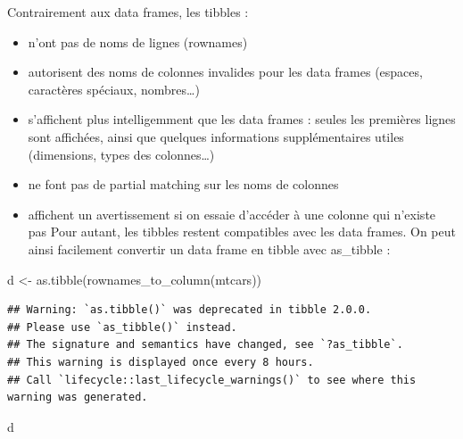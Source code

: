 \documentclass[
]{book}
\newenvironment{Shaded}{\begin{snugshade}}{\end{snugshade}}
\newcommand{\FunctionTok}[1]{\textcolor[rgb]{0.00,0.00,0.00}{#1}}
\newcommand{\NormalTok}[1]{#1}
\newcommand{\OtherTok}[1]{\textcolor[rgb]{0.56,0.35,0.01}{#1}}
\providecommand{\tightlist}{%
  \setlength{\itemsep}{0pt}\setlength{\parskip}{0pt}}
\begin{document}
Contrairement aux data frames, les tibbles :

\begin{itemize}
\tightlist
\item
  n'ont pas de noms de lignes (rownames)
\item
  autorisent des noms de colonnes invalides pour les data frames (espaces, caractères spéciaux, nombres\ldots)
\item
  s'affichent plus intelligemment que les data frames : seules les premières lignes sont affichées, ainsi que quelques informations supplémentaires utiles (dimensions, types des colonnes\ldots)
\item
  ne font pas de partial matching sur les noms de colonnes
\item
  affichent un avertissement si on essaie d'accéder à une colonne qui n'existe pas
  Pour autant, les tibbles restent compatibles avec les data frames. On peut ainsi facilement convertir un data frame en tibble avec as\_tibble :
\end{itemize}

\begin{Shaded}
\begin{Highlighting}[]
\NormalTok{d }\OtherTok{\textless{}{-}} \FunctionTok{as.tibble}\NormalTok{(}\FunctionTok{rownames\_to\_column}\NormalTok{(mtcars))}
\end{Highlighting}
\end{Shaded}

\begin{verbatim}
## Warning: `as.tibble()` was deprecated in tibble 2.0.0.
## Please use `as_tibble()` instead.
## The signature and semantics have changed, see `?as_tibble`.
## This warning is displayed once every 8 hours.
## Call `lifecycle::last_lifecycle_warnings()` to see where this warning was generated.
\end{verbatim}

\begin{Shaded}
\begin{Highlighting}[]
\NormalTok{d}
\end{Highlighting}
\end{Shaded}
\end{document}
